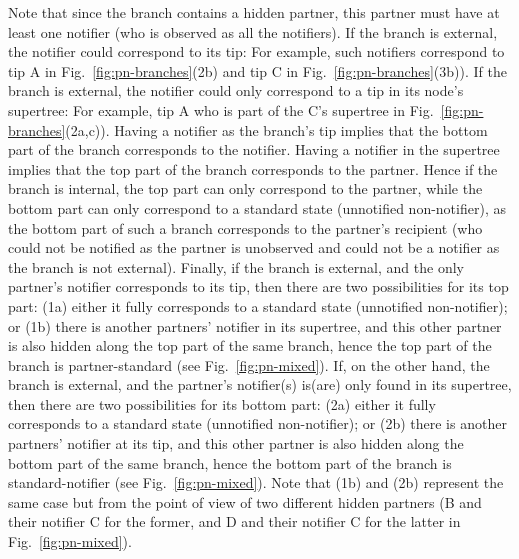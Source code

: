 \documentclass[a4paper,10pt]{article}
\begin{document}
Note that since the branch contains a hidden partner, this partner must have at least one notifier (who is observed as all the notifiers). If the branch is external, the notifier could correspond to its tip: For example, such notifiers correspond to tip A in Fig.~\ref{fig:pn-branches}(2b) and tip C in Fig.~\ref{fig:pn-branches}(3b)). If the branch is external, the notifier could only correspond to a tip in its node's supertree: For example, tip A who is part of the C's supertree in Fig.~\ref{fig:pn-branches}(2a,c)). 
Having a notifier as the branch's tip implies that the bottom part of the branch corresponds to the notifier. Having a notifier in the supertree implies that the top part of the branch corresponds to the partner. Hence if the branch is internal, the top part can only correspond to the partner, while the bottom part can only correspond to a standard state (unnotified non-notifier), as the bottom part of such a branch corresponds to the partner's recipient (who could not be notified as the partner is unobserved and could not be a notifier as the branch is not external). Finally, if the branch is external, and the only partner's notifier corresponds to its tip, then there are two possibilities for its top part: (1a) either it fully corresponds to a standard state (unnotified non-notifier); or (1b) there is another partners' notifier in its supertree, and this other partner is also hidden along the top part of the same branch, hence the top part of the branch is partner-standard (see Fig.~\ref{fig:pn-mixed}). If, on the other hand, the branch is external, and the partner's notifier(s) is(are) only found in its supertree, then there are two possibilities for its bottom part: (2a) either it fully corresponds to a standard state (unnotified non-notifier); or (2b) there is another partners' notifier at its tip, and this other partner is also hidden along the bottom part of the same branch, hence the bottom part of the branch is standard-notifier (see Fig.~\ref{fig:pn-mixed}). Note that (1b) and (2b) represent the same case but from the point of view of two different hidden partners (B and their notifier C for the former, and D and their notifier C for the latter in Fig.~\ref{fig:pn-mixed}).  
\end{document}
